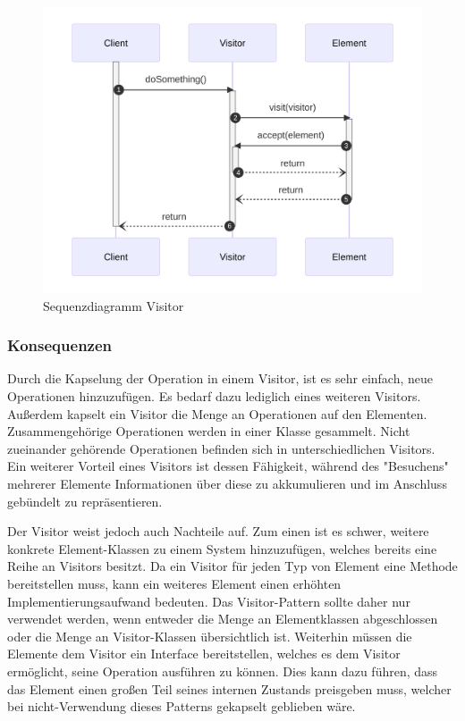 \begin{figure}[!hb]
	\centering
	\includegraphics[width=0.75\linewidth]{images/patterns/visitor-seq.png}
	\caption{Sequenzdiagramm Visitor}
	\label{fig:visitor-seq}
\end{figure}

\subsubsection*{Konsequenzen}
Durch die Kapselung der Operation in einem Visitor, ist es sehr einfach, neue Operationen hinzuzufügen. Es bedarf dazu lediglich eines weiteren Visitors. Außerdem kapselt ein Visitor die Menge an Operationen auf den Elementen. Zusammengehörige Operationen werden in einer Klasse gesammelt. Nicht zueinander gehörende Operationen befinden sich in unterschiedlichen Visitors. Ein weiterer Vorteil eines Visitors ist dessen Fähigkeit, während des "Besuchens" mehrerer Elemente Informationen über diese zu akkumulieren und im Anschluss gebündelt zu repräsentieren. 

Der Visitor weist jedoch auch Nachteile auf. Zum einen ist es schwer, weitere konkrete Element-Klassen zu einem System hinzuzufügen, welches bereits eine Reihe an Visitors besitzt. Da ein Visitor für jeden Typ von Element eine Methode bereitstellen muss, kann ein  weiteres Element einen erhöhten Implementierungsaufwand bedeuten. Das Visitor-Pattern sollte daher nur verwendet werden, wenn entweder die Menge an Elementklassen abgeschlossen oder die Menge an Visitor-Klassen übersichtlich ist. Weiterhin müssen die Elemente dem Visitor ein Interface bereitstellen, welches es dem Visitor ermöglicht, seine Operation ausführen zu können. Dies kann dazu führen, dass das Element einen großen Teil seines internen Zustands preisgeben muss, welcher bei nicht-Verwendung dieses Patterns gekapselt geblieben wäre.